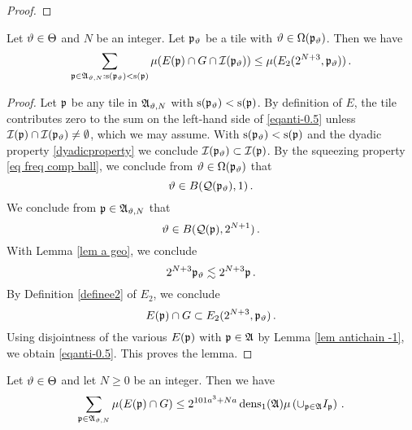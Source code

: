 {\begin{proof}
\end{proof}


\begin{lemma}\label{lem antichain-.5}
Let $\vartheta\in\Theta$ and {$N$} be
an integer. Let $\mathfrak p_{\vartheta}$ be a tile with $\vartheta\in \Omega(\mathfrak p_{\vartheta})$.
Then we have
\begin{equation}\label{eqanti-0.5}
    \sum_{\mathfrak p\in\mathfrak{A}_{\vartheta,N}: \mathrm{s}(\mathfrak p_{\vartheta})<\mathrm{s}(\mathfrak p)}\mu(E(\mathfrak p)\cap G \cap \mathcal{I}(\mathfrak p_{\vartheta}))
    \le  \mu (E_2(2^{N+3},\mathfrak p_{\vartheta}))
 \, .
\end{equation}



\end{lemma}

\begin{proof}


Let $\mathfrak p$ be any tile in $\mathfrak{A}_{\vartheta,N}$ with $\mathrm{s}(\mathfrak p_{\vartheta})<\mathrm{s}(\mathfrak p)$. By definition of
$E$, the tile contributes zero to the sum on the left-hand side of \eqref{eqanti-0.5} unless
 $\mathcal{I}(\mathfrak p)\cap \mathcal{I}(\mathfrak p_{\vartheta}) \neq \emptyset$, which we may assume. With $\mathrm{s}(\mathfrak p_{\vartheta})<\mathrm{s}(\mathfrak p)$
and the dyadic property
\eqref{dyadicproperty} we conclude $\mathcal{I}(\mathfrak p_{\vartheta})\subset  \mathcal{I}(\mathfrak p)$.
By the squeezing property
\eqref{eq freq comp ball},
we conclude from
$\vartheta\in \Omega(\mathfrak p_{\vartheta})$
that
\begin{equation}
    \vartheta\in B(\mathcal{Q}(\mathfrak p_{\vartheta}), 1)\, .
\end{equation}
We conclude from $\mathfrak p \in \mathfrak{A}_{\vartheta,N}$ that
\begin{equation}
    \vartheta \in B(\mathcal{Q}(\mathfrak p), 2^{N+1})\, .
\end{equation}
With Lemma \ref{lem a geo}, we conclude
\begin{equation}
    2^{N+3}\mathfrak p_{\vartheta}  \lesssim  2^{N+3}\mathfrak p \, .
\end{equation}
By Definition \eqref{definee2} of $E_2$, we conclude
\begin{equation}
    E(\mathfrak p)\cap G \subset E_2(2^{N+3},\mathfrak p_{\vartheta})\, .
\end{equation}
Using disjointness of the various $E(\mathfrak p)$ with $\mathfrak p\in \mathfrak{A}$  by Lemma \ref{lem antichain -1}, we obtain \eqref{eqanti-0.5}.
This proves the lemma.
\end{proof}
\begin{lemma}
\label{lem antichain 0}
Let $\vartheta\in\Theta$ and let $N\ge 0$  be
an integer. Then we have
\begin{equation}\label{eqanti00}
    \sum_{\mathfrak p\in\mathfrak{A}_{\vartheta,N}}\mu(E(\mathfrak p)\cap G)
    \le
 2^{101a^3+Na}\operatorname{\operatorname{dens}}_1(\mathfrak{A})\mu\left(\cup_{\mathfrak p\in\mathfrak{A}}I_{\mathfrak p}\right)\, .
\end{equation}
\end{lemma}



}
